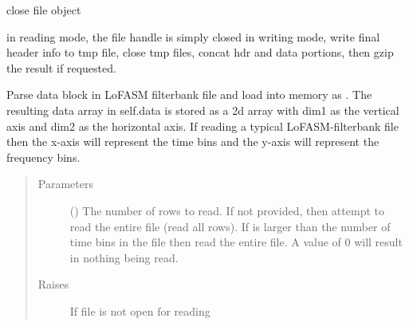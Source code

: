 \documentclass[letterpaper,10pt,english]{sphinxmanual}
\begin{document}
\begin{fulllineitems}
\begin{fulllineitems}
\begin{quote}
\begin{description}
\begin{itemize}
\end{itemize}

\end{description}\end{quote}

\end{fulllineitems}


\begin{fulllineitems}
\label{\detokenize{index:lofasm.bbx.bbx.LofasmFile.close}}
close file object

in reading mode, the file handle is simply closed
in writing mode, write final header info to tmp file,
close tmp files, concat hdr and data portions, then
gzip the result if requested.

\end{fulllineitems}


\begin{fulllineitems}
\label{\detokenize{index:lofasm.bbx.bbx.LofasmFile.read_data}}
Parse data block in LoFASM filterbank file and load into
memory as .
The resulting data array in self.data is stored as a 2d
array with dim1 as the vertical axis and
dim2 as the horizontal axis.
If reading a typical LoFASM-filterbank file then the
x-axis will represent the time bins and the y-axis will
represent the frequency bins.
\begin{quote}\begin{description}
\item[{Parameters}] \leavevmode
{} () \textendash{} The number of rows to read. If not provided, then
attempt to read the entire file (read all rows).
If  is larger than the number of time
bins in the file then read the entire file.
A value of 0 will result in nothing being read.

\item[{Raises}] \leavevmode
{} \textendash{} If file is not open for reading

\end{description}\end{quote}

\end{fulllineitems}


\end{fulllineitems}
\end{document}

